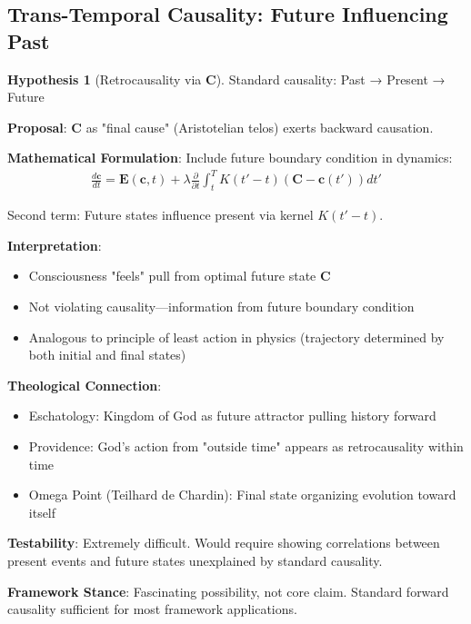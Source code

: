 \documentclass[11pt,a4paper]{article}
\theoremstyle{definition}
\newtheorem{hypothesis}{Hypothesis}[section]
\theoremstyle{remark}
\newcommand{\EE}{\mathbf{E}}
\newcommand{\cc}{\mathbf{c}}
\begin{document}
\begin{enumerate}
\subsection{Trans-Temporal Causality: Future Influencing Past}

\begin{hypothesis}[Retrocausality via \(\mathbf{C}\)]
Standard causality: Past → Present → Future

\textbf{Proposal}: \(\mathbf{C}\) as "final cause" (Aristotelian telos) exerts backward causation.

\textbf{Mathematical Formulation}: Include future boundary condition in dynamics:
\begin{align}
\frac{d\cc}{dt} = \EE(\cc, t) + \lambda \frac{\partial}{\partial t}\int_t^T K(t'-t)(\mathbf{C} - \cc(t')) dt'
\end{align}

Second term: Future states influence present via kernel \(K(t'-t)\).

\textbf{Interpretation}:
\begin{itemize}
    \item Consciousness "feels" pull from optimal future state \(\mathbf{C}\)
    \item Not violating causality—information from future boundary condition
    \item Analogous to principle of least action in physics (trajectory determined by both initial and final states)
\end{itemize}

\textbf{Theological Connection}:
\begin{itemize}
    \item Eschatology: Kingdom of God as future attractor pulling history forward
    \item Providence: God's action from "outside time" appears as retrocausality within time
    \item Omega Point (Teilhard de Chardin): Final state organizing evolution toward itself
\end{itemize}

\textbf{Testability}: Extremely difficult. Would require showing correlations between present events and future states unexplained by standard causality.

\textbf{Framework Stance}: Fascinating possibility, not core claim. Standard forward causality sufficient for most framework applications.
\end{hypothesis}


\end{enumerate}
\end{document}
